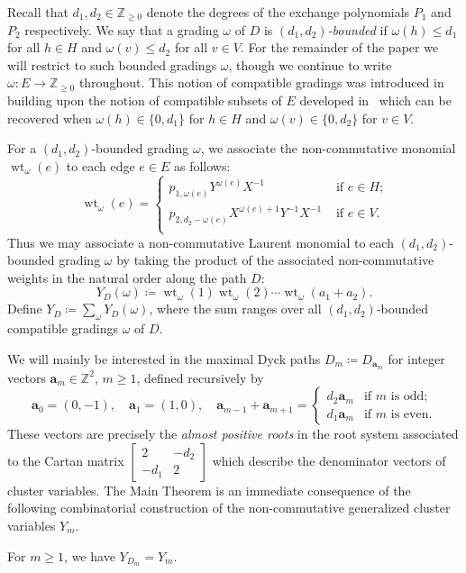 \documentclass[ALCO,ThmDefs,Unicode,epreuves]{cedram}
\newcommand{\bfa}{\mathbf{a}}
\newcommand{\ZZ}{\mathbb{Z}}
\DeclareMathOperator{\wt}{wt}
\begin{document}
 Recall that $d_1,d_2\in\ZZ_{\ge0}$ denote the degrees of the exchange polynomials $P_1$ and $P_2$ respectively. 
 We say that a grading $\omega$ of $D$ is \emph{$(d_1,d_2)$-bounded} if $\omega(h)\le d_1$ for all $h\in H$ and $\omega(v)\le d_2$ for all $v\in V$. 
 For the remainder of the paper we will restrict to such bounded gradings $\omega$, though we continue to write $\omega:E\to\ZZ_{\ge0}$ throughout.
 This notion of compatible gradings was introduced in~\cite{rupel2} building upon the notion of compatible subsets of $E$ developed in~\cite{lee-li-zelevinsky} which can be recovered when $\omega(h)\in\{0,d_1\}$ for $h\in H$ and $\omega(v)\in\{0,d_2\}$ for $v\in V$.

 For a $(d_1,d_2)$-bounded grading $\omega$, we associate the non-commutative monomial $\wt_\omega(e)$ to each edge $e\in E$ as follows:
 \begin{equation}
 \label{eq:edge weights}
 \wt_\omega(e)=\begin{cases}
 p_{1,\omega(e)}Y^{\omega(e)}X^{-1} & \text{ if $e\in H$;}\\
 p_{2,d_2-\omega(e)}X^{\omega(e)+1}Y^{-1}X^{-1} & \text{ if $e\in V$.}\\
 \end{cases}
 \end{equation}
 Thus we may associate a non-commutative Laurent monomial to each $(d_1,d_2)$-bounded grading $\omega$ by taking the product of the associated non-commutative weights in the natural order along the path $D$:
 \begin{equation}
 \label{eq:total path weights}
 Y_D(\omega)\coloneqq \wt_\omega(1)\wt_\omega(2)\cdots\wt_\omega(a_1+a_2).
 \end{equation} 
 Define $Y_D\coloneqq \sum\limits_\omega Y_D(\omega)$, where the sum ranges over all $(d_1,d_2)$-bounded compatible gradings $\omega$ of $D$.

 We will mainly be interested in the maximal Dyck paths $D_m\coloneqq D_{\bfa_m}$ for integer vectors $\bfa_m\in\ZZ^2$, $m\ge1$, defined recursively by
 \begin{equation}
 \label{eq:roots recursive}
 \bfa_0=(0,-1),\quad
 \bfa_1=(1,0),\quad
 \bfa_{m-1}+\bfa_{m+1}=\begin{cases}d_2\bfa_m & \text{if $m$ is odd;}\\ d_1\bfa_m & \text{if $m$ is even.}\end{cases}
 \end{equation}
 These vectors are precisely the \emph{almost positive roots} in the root system associated to the Cartan matrix $\left[\begin{array}{cc} 2 & -d_2\\ -d_1 & 2\end{array}\right]$ which describe the denominator vectors of cluster variables.
 The Main Theorem is an immediate consequence of the following combinatorial construction of the non-commutative generalized cluster variables $Y_m$.
 \begin{theorem}
 \label{th:combinatorial construction}
 For $m\ge1$, we have $Y_{D_m}=Y_m$.
 \end{theorem}
\end{document}
